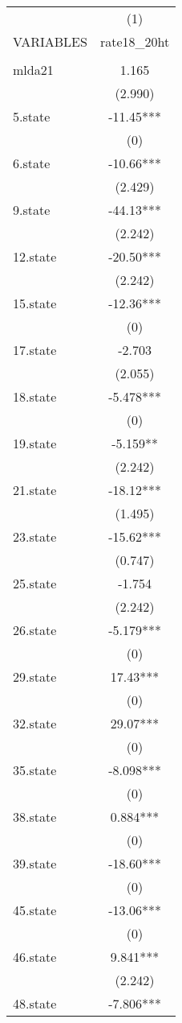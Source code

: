 \begin{tabular}{lc} \hline
 & (1) \\
VARIABLES & rate18\_20ht \\ \hline
 &  \\
mlda21 & 1.165 \\
 & (2.990) \\
5.state & -11.45*** \\
 & (0) \\
6.state & -10.66*** \\
 & (2.429) \\
9.state & -44.13*** \\
 & (2.242) \\
12.state & -20.50*** \\
 & (2.242) \\
15.state & -12.36*** \\
 & (0) \\
17.state & -2.703 \\
 & (2.055) \\
18.state & -5.478*** \\
 & (0) \\
19.state & -5.159** \\
 & (2.242) \\
21.state & -18.12*** \\
 & (1.495) \\
23.state & -15.62*** \\
 & (0.747) \\
25.state & -1.754 \\
 & (2.242) \\
26.state & -5.179*** \\
 & (0) \\
29.state & 17.43*** \\
 & (0) \\
32.state & 29.07*** \\
 & (0) \\
35.state & -8.098*** \\
 & (0) \\
38.state & 0.884*** \\
 & (0) \\
39.state & -18.60*** \\
 & (0) \\
45.state & -13.06*** \\
 & (0) \\
46.state & 9.841*** \\
 & (2.242) \\
48.state & -7.806*** \\

\end{tabular}
